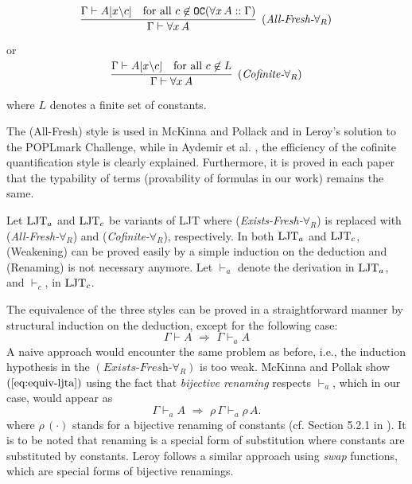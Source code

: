 \documentclass{svjour3}                     %
\newcommand{\seqr}[3]{\rbm{\infer{#2}{#1}}\;\;\text{$#3$}}
\newcommand{\Ga}{\Gamma}
\newcommand{\vd}{\vdash}
\newcommand{\bs}{\backslash}
\newcommand{\rbm}[1]{\raisebox{-1.5ex}[0.5ex]{$#1$}}
\newcommand{\tOC}{\textup{\tt OC}}
\newcommand{\ljt}{\textup{LJT}}
\newcommand{\ljta}{\textup{LJT}_a}
\newcommand{\vda}{\vdash_{\!\!\!a}}
\newcommand{\vdc}{\vdash_{\!\!\!c}}
\begin{document}
\[
  \seqr
  {\Ga \vd A[x\bs c] & \text{for all } c \not\in \tOC(\forall x\,A :: \Ga)}
  {\Ga \vd \forall x\, A}
  {(\textit{All-Fresh-}\forall_R)}
\]

\noindent or

\[
  \seqr
  {\Ga \vd A[x\bs c] & \text{for all } c \not\in L}
  {\Ga \vd \forall x\, A}
  {(\textit{Cofinite-}\forall_R)}
\]

\noindent where $L$ denotes a finite set of constants. 

The (All-Fresh) style is used in McKinna and Pollack \cite{mcpol93,mcpol99} and in Leroy's solution \cite{leroy-nameless} to the POPLmark Challenge, while in Aydemir et al. \cite{engineering}, the efficiency of the cofinite quantification style is clearly explained. Furthermore, it is proved in each paper that the typability of terms (provability of formulas in our work) remains the same.

Let $\ljt_{a}$ and $\ljt_{c}$ be variants of LJT where ({\it Exists-Fresh-}$\forall_R$) is replaced with ({\it All-Fresh-}$\forall_R$) and ({\it Cofinite-}$\forall_R$), respectively. In both $\ljt_{a}$ and $\ljt_{c}$, (Weakening) can be proved easily by a simple induction on the deduction and (Renaming) is not necessary anymore. Let $\vda$ denote the derivation in $\ljta$, and $\vdc$, in $\ljt_c$.

The equivalence of the three styles can be proved in a straightforward manner by structural induction on the deduction, except for the following case:
\begin{equation}
  \label{eq:equiv-ljta}
  \Ga \vd A \,\,\Rightarrow\,\, \Ga \vda A  
\end{equation}
A naive approach would encounter the same problem as before, i.e., the induction hypothesis in the $(\textit{Exists-Fresh-}\forall_R)$ is too weak. McKinna and Pollak show $(\ref{eq:equiv-ljta})$ using the fact that \textit{bijective renaming} respects $\vda$, which in our case, would appear as
\begin{equation}
  \label{eq:bij-renaming}
  \Ga \vda A \,\,\Rightarrow\,\, \rho\,\Ga \vda \rho\, A.
\end{equation}
where $\rho\,(\cdot)$ stands for a bijective renaming of constants (cf. Section 5.2.1 in \cite{mcpol99}). It is to be noted that renaming is a special form of substitution where constants are substituted by constants. Leroy \cite{leroy-nameless} follows a similar approach using \textit{swap} functions, which are special forms of bijective renamings.
\end{document}
